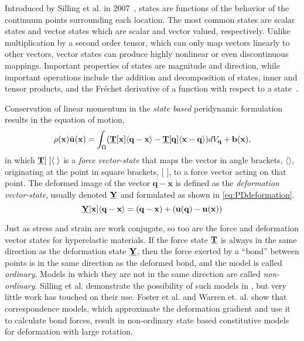 \documentclass[11pt]{amsart}
\newcommand\vstate[3]{%
	\mathbf{\underline{#1}}%
	\ifstrempty{#2}{}{[#2]}%
	\ifstrempty{#3}{}{\langle #3 \rangle}}
\begin{document}
Introduced by Silling et al. in 2007~\cite{silling2007peridynamic}, states are functions of the behavior of the continuum points surrounding each location.
The most common states are scalar states and vector states which are scalar and vector valued, respectively.
Unlike multiplication by a second order tensor, which can only map vectors linearly to other vectors, vector states can produce highly nonlinear or even discontinuous mappings.
Important properties of states are magnitude and direction, while important operations include the addition and decomposition of states, inner and tensor products, and the Fr\'{e}chet derivative of a function with respect to a state~\cite{silling2007peridynamic}.

Conservation of linear momentum in the \textit{state based} peridynamic formulation results in the equation of motion,
%
\begin{equation}
\label{eq:PDstateEoM}
\rho(\mathbf{x})\ddot{\mathbf{u}}(\mathbf{x}) = \int_\Omega (\vstate{T}{\mathbf{x}}{\mathbf{q}-\mathbf{x}}-\vstate{T}{\mathbf{q}}{\mathbf{x}-\mathbf{q}}) dV_\mathbf{q}  + \mathbf{b}(\mathbf{x}),
\end{equation}
%
in which $\vstate{T}{\;}{\;}$ is a \textit{force vector-state} that maps the vector in angle brackets, $\langle \rangle$, originating at the point in square brackets, [ ], to a force vector acting on that point.
The deformed image of the vector $\mathbf{q}-\mathbf{x}$ is defined as the \textit{deformation vector-state}, usually denoted $\vstate{Y}{}{}$ and formulated as shown in \cref{eq:PDdeformation}. 
%
\begin{equation}
\label{eq:PDdeformation}
\vstate{Y}{\mathbf{x}}{\mathbf{q}-\mathbf{x}} = (\mathbf{q}-\mathbf{x}) + (\mathbf{u}(\mathbf{q})-\mathbf{u}(\mathbf{x}))
\end{equation}
%

Just as stress and strain are work conjugate, so too are the force and deformation vector states for hyperelastic materials.
If the force state $\vstate{T}{}{}$ is always in the same direction as the deformation state $\vstate{Y}{}{}$, then the force exerted by a ``bond'' between points is in the same direction as the deformed bond, and the model is called \textit{ordinary}.  
Models in which they are not in the same direction are called \textit{non-ordinary}.
Silling et al. demonstrate the possibility of such models in \cite{silling2010peridynamic}, but very little work has touched on their use.
Foster et al. \cite{foster2010viscoplasticity} and Warren et. al. \cite{warren2009non} show that correspondence models, which approximate the deformation gradient and use it to calculate bond forces, result in non-ordinary state based constitutive models for deformation with large rotation.
%
\FloatBarrier
\end{document}

